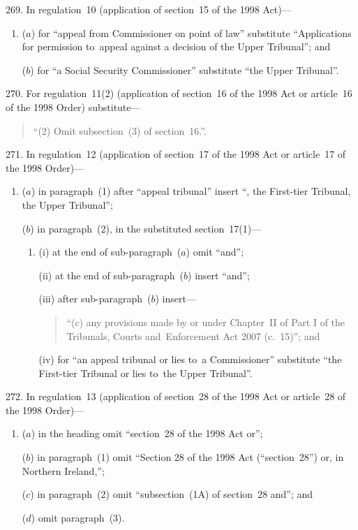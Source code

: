 \documentclass[12pt,a4paper]{article}
\begin{document}
269.  In regulation~10 (application of section~15 of the 1998 Act)—
\begin{enumerate}\item[]
($a$) for “appeal from Commissioner on point of law” substitute “Applications for permission to~appeal against a decision of the Upper Tribunal”; and

($b$) for “a Social Security Commissioner” substitute “the Upper Tribunal”.
\end{enumerate}

\medskip

270.  For regulation~11(2) (application of section~16 of the 1998 Act or article~16 of the 1998 Order) substitute—
\begin{quotation}
“(2) Omit subsection~(3) of section~16.”.
\end{quotation}

\medskip

271.  In regulation~12 (application of section~17 of the 1998 Act or article~17 of the 1998 Order)—
\begin{enumerate}\item[]
($a$) in paragraph~(1) after “appeal tribunal” insert “, the First-tier Tribunal, the Upper Tribunal”;

($b$) in paragraph~(2), in the substituted section~17(1)—
\begin{enumerate}\item[]
(i) at the end of sub-paragraph~($a$)  omit “and”;

(ii) at the end of sub-paragraph~($b$)  insert “and”;

(iii) after sub-paragraph~($b$)  insert—
\begin{quotation}
“($c$) any provisions made by or under Chapter~II of Part I of the Tribunals, Courts and~Enforcement Act 2007 (c.~15)”; and
\end{quotation}

(iv) for “an appeal tribunal or lies to~a Commissioner” substitute “the First-tier Tribunal or lies to~the Upper Tribunal”.
\end{enumerate}
\end{enumerate}

\medskip

272.  In regulation~13 (application of section~28 of the 1998 Act or article~28 of the 1998 Order)—
\begin{enumerate}\item[]
($a$) in the heading omit “section~28 of the 1998 Act or”;

($b$) in paragraph~(1) omit “Section 28 of the 1998 Act (“section~28”) or, in Northern Ireland,”;

($c$) in paragraph~(2) omit “subsection~(1A) of section~28 and”; and

($d$) omit paragraph~(3).
\end{enumerate}
\end{document}
